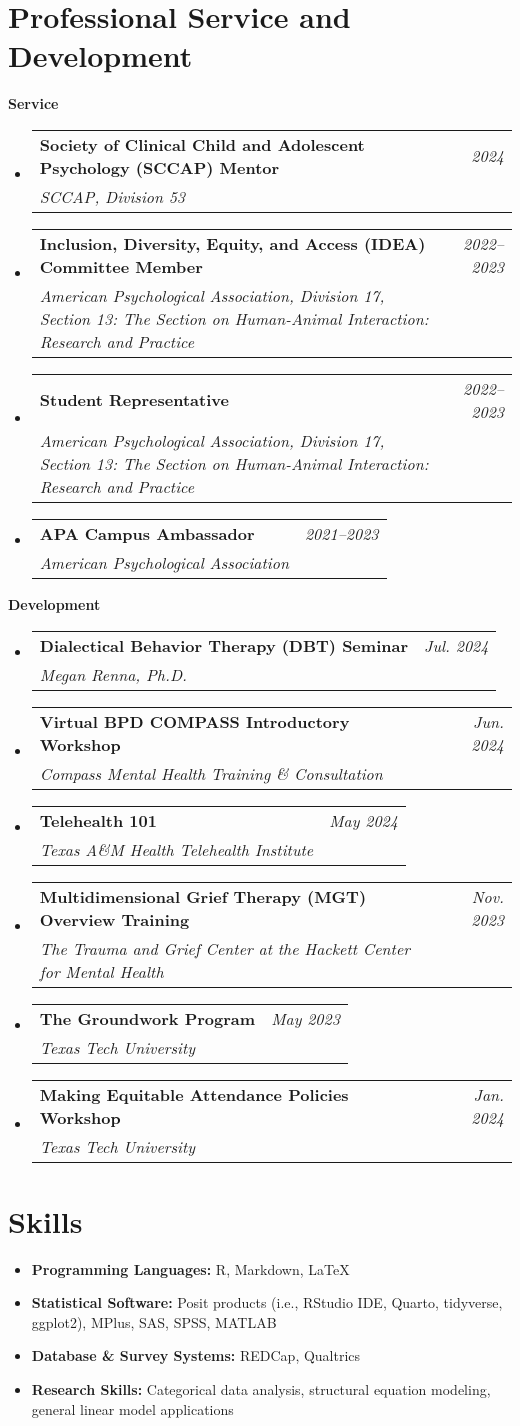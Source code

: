 \documentclass[letter,11pt]{article}
\makeatletter
\newcommand{\resumeItem}[2]{
  \item{
    \textbf{#1}{\hspace{0.5mm}#2 \vspace{-0.5mm}}
  }
}
\newcommand{\resumeSubheading}[4]{
\vspace{0.5mm}\item
    \begin{tabular*}{0.98\textwidth}[t]{l@{\extracolsep{\fill}}r}
        \textbf{#1} & \textit{\footnotesize{#4}} \\
        \textit{\footnotesize{#3}} &  \footnotesize{#2}\\
    \end{tabular*}
    \vspace{-2.4mm}
}
\newcommand{\resumeSubItem}[2]{\resumeItem{#1}{#2}\vspace{-4pt}}
\newcommand{\resumeSubHeadingListStart}{\begin{itemize}[leftmargin=*,labelsep=1mm]}
\newcommand{\resumeHeadingSkillStart}{\begin{itemize}[leftmargin=*,itemsep=1.7mm, rightmargin=2ex]}
\newcommand{\resumeSubHeadingListEnd}{\end{itemize}\vspace{2mm}}
\newcommand{\resumeHeadingSkillEnd}{\end{itemize}\vspace{-2mm}}
\makeatother
\begin{document}
\section{\textbf{Professional Service and Development}}

\vspace{1mm}

\textbf{Service}
\vspace{-4mm}

  \resumeSubHeadingListStart
    \resumeSubheading
      {Society of Clinical Child and Adolescent Psychology (SCCAP) Mentor}{}
      {SCCAP, Division 53}{2024}
    \resumeSubheading
        {Inclusion, Diversity, Equity, and Access (IDEA) Committee Member}{}
        {American Psychological Association, Division 17, Section 13: The Section on Human-Animal Interaction: Research and Practice}{2022--2023}
    \resumeSubheading
        {Student Representative}{}
        {American Psychological Association, Division 17, Section 13: The Section on Human-Animal Interaction: Research and Practice}{2022--2023}
    \resumeSubheading
        {APA Campus Ambassador}{}
        {American Psychological Association}{2021--2023}
    \resumeSubHeadingListEnd


\textbf{Development}
\vspace{-3mm}

  \resumeSubHeadingListStart
    \resumeSubheading
      {Dialectical Behavior Therapy (DBT) Seminar}{}
      {Megan Renna, Ph.D.}{Jul. 2024}
    \resumeSubheading
      {Virtual BPD COMPASS Introductory Workshop}{}
      {Compass Mental Health Training \& Consultation}{Jun. 2024}
    \resumeSubheading
      {Telehealth 101}{}
      {Texas A\&M Health Telehealth Institute}{May 2024}
    \resumeSubheading
      {Multidimensional Grief Therapy (MGT) Overview Training}{}
      {The Trauma and Grief Center at the Hackett Center for Mental Health}{Nov. 2023}
    \resumeSubheading
      {The Groundwork Program}{}
      {Texas Tech University}{May 2023}
    \resumeSubheading
      {Making Equitable Attendance Policies Workshop}{}
      {Texas Tech University}{Jan. 2024}
    \resumeSubHeadingListEnd
    \vspace{-6mm}

\section{\textbf{Skills}}
 \resumeHeadingSkillStart
  \resumeSubItem{Programming Languages: }
    {R, Markdown, LaTeX}
  \resumeSubItem{Statistical Software: }
    {Posit products (i.e., RStudio IDE, Quarto, tidyverse, ggplot2), MPlus, SAS, SPSS, MATLAB}
  \resumeSubItem{Database \& Survey Systems: }
    {REDCap, Qualtrics}
  \resumeSubItem{Research Skills: }{Categorical data analysis, structural equation modeling, general linear model applications}
 \resumeHeadingSkillEnd
 \vspace{-6mm}
\end{document}
